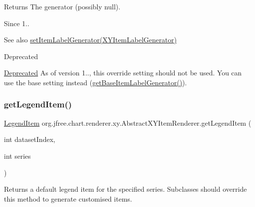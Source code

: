 \begin{DoxyReturn}{Returns}
The generator (possibly {\ttfamily null}).
\end{DoxyReturn}
\begin{DoxySince}{Since}
1..
\end{DoxySince}
\begin{DoxySeeAlso}{See also}
\mbox{\hyperlink{classorg_1_1jfree_1_1chart_1_1renderer_1_1xy_1_1_abstract_x_y_item_renderer_add7aa14845378a40b6db6159200cbab1}{set\+Item\+Label\+Generator(\+X\+Y\+Item\+Label\+Generator)}}
\end{DoxySeeAlso}
\begin{DoxyRefDesc}{Deprecated}
\item[\mbox{\hyperlink{deprecated__deprecated000200}{Deprecated}}]As of version 1.., this override setting should not be used. You can use the base setting instead (\mbox{\hyperlink{classorg_1_1jfree_1_1chart_1_1renderer_1_1xy_1_1_abstract_x_y_item_renderer_afee247586678303556027473d842c91b}{get\+Base\+Item\+Label\+Generator()}}). \end{DoxyRefDesc}
\mbox{\label{classorg_1_1jfree_1_1chart_1_1renderer_1_1xy_1_1_abstract_x_y_item_renderer_ae11b2c6fab0afe8380961a7ecdc03ab3}} 
\subsubsection{\texorpdfstring{get\+Legend\+Item()}{getLegendItem()}}
{\footnotesize\ttfamily \mbox{\hyperlink{classorg_1_1jfree_1_1chart_1_1_legend_item}{Legend\+Item}} org.\+jfree.\+chart.\+renderer.\+xy.\+Abstract\+X\+Y\+Item\+Renderer.\+get\+Legend\+Item (\begin{DoxyParamCaption}\item[{int}]{dataset\+Index,  }\item[{int}]{series }\end{DoxyParamCaption})}

Returns a default legend item for the specified series. Subclasses should override this method to generate customised items.


